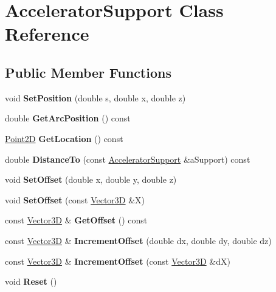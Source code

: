 \hypertarget{classAcceleratorSupport}{}\section{Accelerator\+Support Class Reference}
\label{classAcceleratorSupport}
\subsection*{Public Member Functions}
\begin{DoxyCompactItemize}
\item 
\mbox{\label{classAcceleratorSupport_a3d1f38dc08dcd877a07f50a96425f293}} 
void {\bfseries Set\+Position} (double s, double x, double z)
\item 
\mbox{\label{classAcceleratorSupport_a0312e8cceec8274d3cd44efb0121d410}} 
double {\bfseries Get\+Arc\+Position} () const
\item 
\mbox{\label{classAcceleratorSupport_a382e1698f3d45a2a713b77ec5c06242f}} 
\hyperlink{classTVec2D}{Point2D} {\bfseries Get\+Location} () const
\item 
\mbox{\label{classAcceleratorSupport_ae0d45901cbfaa582abd9e3d280bc50d9}} 
double {\bfseries Distance\+To} (const \hyperlink{classAcceleratorSupport}{Accelerator\+Support} \&a\+Support) const
\item 
\mbox{\label{classAcceleratorSupport_a0784f7a91f1e3b37c1fec5d9d7d80f9e}} 
void {\bfseries Set\+Offset} (double x, double y, double z)
\item 
\mbox{\label{classAcceleratorSupport_a139fa4e844f8a74ed55b207d6bd68517}} 
void {\bfseries Set\+Offset} (const \hyperlink{classTVec3D}{Vector3D} \&X)
\item 
\mbox{\label{classAcceleratorSupport_a53c2f48185cefc3940d817515b768eba}} 
const \hyperlink{classTVec3D}{Vector3D} \& {\bfseries Get\+Offset} () const
\item 
\mbox{\label{classAcceleratorSupport_a8199f8401e14ac6bbd9d013f797876eb}} 
const \hyperlink{classTVec3D}{Vector3D} \& {\bfseries Increment\+Offset} (double dx, double dy, double dz)
\item 
\mbox{\label{classAcceleratorSupport_a8f6f6869d8ba7cac9da00095ed7650e0}} 
const \hyperlink{classTVec3D}{Vector3D} \& {\bfseries Increment\+Offset} (const \hyperlink{classTVec3D}{Vector3D} \&dX)
\item 
\mbox{\label{classAcceleratorSupport_a78b6c10ccbe31ca4bb384ded5bfef600}} 
void {\bfseries Reset} ()
\end{DoxyCompactItemize}
